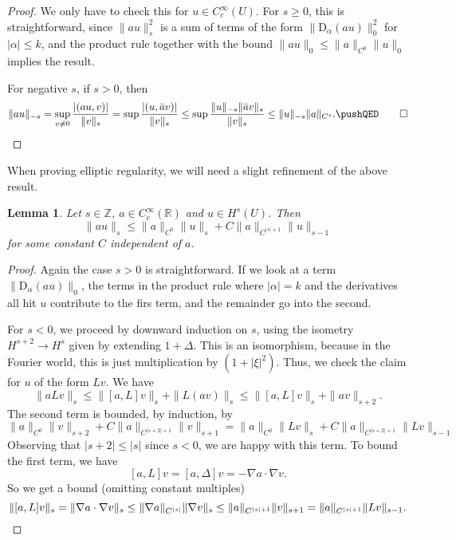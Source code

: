 \documentclass{shortart}
\newtheorem*{lemma}{Lemma}
\theoremstyle{definition}
\newcommand\R{\mathbb{R}}
\newcommand\Z{\mathbb{Z}}
\newcommand\D{\mathrm{D}}
\begin{document}
\begin{proof}
  We only have to check this for $u \in C_c^\infty(U)$. For $s \geq 0$, this is straightforward, since $\|au\|_s^2$ is a sum of terms of the form $\|\D_\alpha (au)\|_0^2$ for $|\alpha| \leq k$, and the product rule together with the bound $\|a u\|_0 \leq \|a\|_{C^0} \|u\|_0$ implies the result.
  
%
  For negative $s$, if $s > 0$, then
  \[
    \|au\|_{-s} = \sup_{v \not= 0} \frac{|(au, v)|}{\|v\|_s} = \sup \frac{|(u, \bar{a}v)|}{\|v\|_s} \leq \sup \frac{\|u\|_{-s} \|\bar{a}v\|_s}{\|v\|_s} \leq \|u\|_{-s} \|a\|_{C^s}.\fakeqed
  \]\ifplastex\fakeqed\fi
\end{proof}
When proving elliptic regularity, we will need a slight refinement of the above result.
\begin{lemma}
   Let $s \in \Z$, $a \in C_c^\infty(\R)$ and $u \in H^s(U)$. Then
  \[
    \|au\|_s \leq \|a\|_{C^0} \|u\|_s + C \|a\|_{C^{|s| + 1}} \|u\|_{s - 1}
  \]
  for some constant $C$ independent of $a$.
\end{lemma}

\begin{proof}
  Again the case $s > 0$ is straightforward. If we look at a term $\|\D_\alpha(a u)\|_0$, the terms in the product rule where $|\alpha| = k$ and the derivatives all hit $u$ contribute to the firs term, and the remainder go into the second. 

  For $s < 0$, we proceed by downward induction on $s$, using the isometry $H^{s + 2} \to H^s$ given by extending $1 + \Delta$. This is an isomorphism, because in the Fourier world, this is just multiplication by $(1 + |\xi|^2)$. Thus, we check the claim for $u$ of the form $Lv$. We have
  \[
    \|a Lv\|_s \leq \|[a, L]v\|_s + \|L(av)\|_s \leq \|[a, L]v\|_s + \|av\|_{s + 2}.
  \]
  The second term is bounded, by induction, by
  \[
    \|a\|_{C^0} \|v\|_{s + 2} + C \|a\|_{C^{|s + 2| + 1}} \|v\|_{s + 1} = \|a\|_{C^0} \|Lv\|_s + C\|a\|_{C^{|s + 2| + 1}} \|Lv\|_{s - 1}
  \]
  Observing that $|s + 2| \leq |s|$ since $s < 0$, we are happy with this term. To bound the first term, we have
  \[
    [a, L]v = [a, \Delta]v = -\nabla a \cdot \nabla v.
  \]
  So we get a bound (omitting constant multiples)
  \[
    \|[a, L]v\|_s = \|\nabla a \cdot \nabla v\|_s \leq \|\nabla a\|_{C^{|s|}} \|\nabla v\|_{s} \leq \|a\|_{C^{|s| + 1}} \|v\|_{s + 1} = \|a\|_{C^{|s| + 1}} \|Lv\|_{s - 1}.\qedhere
  \]
\end{proof}
\end{document}
